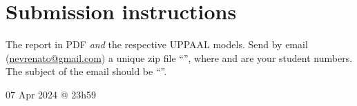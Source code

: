 \documentclass[11pt]{article}
\theoremstyle{myplain}
\theoremstyle{definition} %
\begin{document}
\section*{Submission instructions}

\begin{mdframed}
   The report in PDF \emph{and} the
  respective 
  UPPAAL models. Send by email (\underline{nevrenato@gmail.com})
  a unique zip file ``'', where  and
   are your student numbers. The subject of the email should be
  ``''.

 07 Apr 2024 @ 23h59
\end{mdframed}
\end{document}

